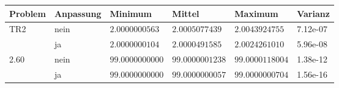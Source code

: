 \begin{tabularx}{\textwidth}{l  X X X X X}
\toprule
\textbf{Problem} & Anpassung & Minimum & Mittel & Maximum & Varianz\\
\midrule
TR2 & nein & $2.0000000563$ & $2.0005077439$ & $2.0043924755$ & 7.12e-07 \\
& ja & $2.0000000104$ & $2.0000491585$ & $2.0024261010$ & 5.96e-08 \\
2.60 & nein & $99.0000000000$ & $99.0000001238$ & $99.0000118004$ & 1.38e-12 \\
& ja & $99.0000000000$ & $99.0000000057$ & $99.0000000704$ & 1.56e-16 \\
\bottomrule
\end{tabularx}
